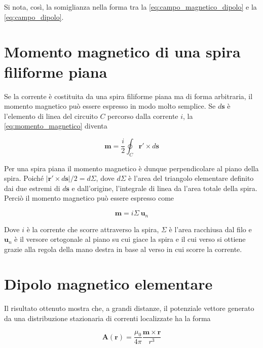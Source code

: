 Si nota, così, la somiglianza nella forma tra la \ref{eq:campo_magnetico_dipolo} e la \ref{eq:campo_dipolo}. \\

\section{Momento magnetico di una spira filiforme piana}

Se la corrente è costituita da una spira filiforme piana ma di forma arbitraria, il momento magnetico può essere espresso in modo molto semplice. Se $ d\mathbf{s}$ è l'elemento di linea del circuito $C$ percorso dalla corrente $i$, la \ref{eq:momento_magnetico} diventa 

\begin{equation}
    \mathbf{m} = \frac{i}{2} \oint_{C} \mathbf{r'} \times d \mathbf{s}
\end{equation}

Per una spira piana il momento magnetico è dunque perpendicolare al piano della spira. Poiché $|\mathbf{r'} \times d \mathbf{s}|/2 = d\Sigma$, dove $d \Sigma$ è l'area del triangolo elementare definito dai due estremi di $d \mathbf{s}$ e dall'origine, l'integrale di linea da l'area totale della spira. Perciò il momento magnetico può essere espresso come 

\begin{tcolorbox}[colback=yellow!10!white, colframe=orange!70!black, boxrule=0.8pt]
\begin{equation} 
    \mathbf{m} = i \Sigma \ \mathbf{u}_n
\end{equation}
\end{tcolorbox}

Dove $i$ è la corrente che scorre attraverso la spira, $\Sigma$ è l'area racchiusa dal filo e $\mathbf{u}_n$ è il versore ortogonale al piano su cui giace la spira e il cui verso si ottiene grazie alla regola della mano destra in base al verso in cui scorre la corrente.\\

\section{Dipolo magnetico elementare} 

Il risultato ottenuto mostra che, a grandi distanze, il potenziale vettore generato da una distribuzione stazionaria di correnti localizzate ha la forma

\begin{tcolorbox}[colback=yellow!10!white, colframe=orange!70!black, boxrule=0.8pt]
\begin{equation}
    \mathbf{A}(\mathbf{r}) = \frac{\mu_0}{4 \pi} \frac{\mathbf{m} \times \mathbf{r}}{r^3}
\end{equation}
\end{tcolorbox}

